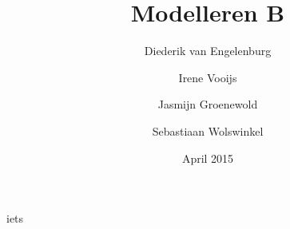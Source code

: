 \documentclass{report}
\title{Modelleren B}
\author{Diederik van Engelenburg \and Irene Vooijs \and Jasmijn Groenewold \and Sebastiaan Wolswinkel}
\date{April 2015}
\begin{document}
\maketitle





iets
\end{document}
